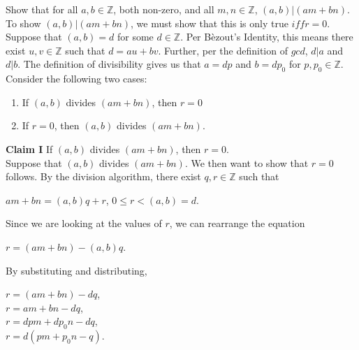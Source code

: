 \documentclass[12pt]{article}
\newcommand{\Z}{\mathbb{Z}}
\newenvironment{problem}[2][Problem]{\begin{trivlist}
\item[\hskip \labelsep {\bfseries #1}\hskip \labelsep {\bfseries #2.}]}{\end{trivlist}}
\newenvironment{nscenter}
 {\parskip=0pt\par\nopagebreak\centering}
 {\par\noindent\ignorespacesafterend}
\begin{document}
\begin{problem}{3}
Show that for all $a,b \in \mathbb{Z}$, both non-zero, and all $m, n \in \mathbb{Z}$, $(a,b)|(am+bn)$. \\


\noindent
To show $(a,b)|(am+bn)$, we must show that this is only true $iff r=0$. Suppose that $(a,b)=d$ for some $d \in \Z$. Per B\`ezout's Identity, this means there exist $u,v \in \Z$ such that $d=au+bv$. Further, per the definition of $gcd$, $d|a$ and $d|b$. The definition of divisibility gives us that $a=dp$ and $b=dp_0$ for $p,p_0 \in \Z$. Consider the following two cases:

\begin{nscenter}
\begin{enumerate}[label=(\alph*)] 
\item If $(a,b)$ divides $(am+bn)$, then $r=0$
\item If $r=0$, then $(a,b)$ divides $(am+bn)$.
\end{enumerate}
\end{nscenter}

\noindent
\textbf{Claim I} If $(a,b)$ divides $(am+bn)$, then $r=0$. \\

\noindent
Suppose that $(a,b)$ divides $(am+bn)$. We then want to show that $r=0$ follows. By the division algorithm, there exist $q, r \in \Z$ such that 

\begin{center}
$am+bn=(a,b)q+r$, $0 \leq r < (a,b) = d$.
\end{center}

\noindent
Since we are looking at the values of $r$, we can rearrange the equation

\begin{center}
$r=(am+bn)-(a,b)q$.
\end{center}

\noindent
By substituting and distributing,

\begin{center}
$r=(am+bn)-dq$, \\
$r=am+bn-dq$, \\
$r=dpm+dp_0n-dq$, \\
$r=d(pm+p_0n-q)$.\\
\end{center}


\end{problem}
\end{document}
